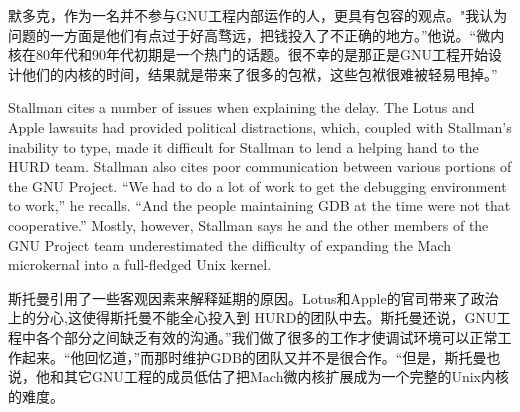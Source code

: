 \ifdefined\chs
默多克，作为一名并不参与GNU工程内部运作的人，更具有包容的观点。"我认为问题的一方面是他们有点过于好高骛远，把钱投入了不正确的地方。''他说。``微内核在80年代和90年代初期是一个热门的话题。很不幸的是那正是GNU工程开始设计他们的内核的时间，结果就是带来了很多的包袱，这些包袱很难被轻易甩掉。''
\fi




\ifdefined\eng
Stallman cites a number of issues when explaining the delay. The Lotus and Apple lawsuits had provided political distractions, which, coupled with Stallman's inability to type, made it difficult for Stallman to lend a helping hand to the HURD team. Stallman also cites poor communication between various portions of the GNU Project. ``We had to do a lot of work to get the debugging environment to work,'' he recalls. ``And the people maintaining GDB at the time were not that cooperative.'' Mostly, however, Stallman says he and the other members of the GNU Project team underestimated the difficulty of expanding the Mach microkernal into a full-fledged Unix kernel.
\fi

\ifdefined\chs
斯托曼引用了一些客观因素来解释延期的原因。Lotus和Apple的官司带来了政治上的分心,这使得斯托曼不能全心投入到 HURD的团队中去。斯托曼还说，GNU工程中各个部分之间缺乏有效的沟通。''我们做了很多的工作才使调试环境可以正常工作起来。``他回忆道，''而那时维护GDB的团队又并不是很合作。``但是，斯托曼也说，他和其它GNU工程的成员低估了把Mach微内核扩展成为一个完整的Unix内核的难度。
\fi

